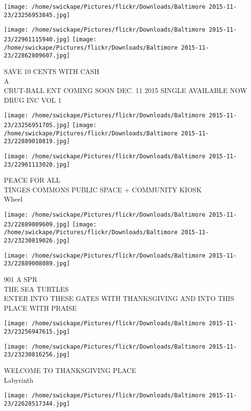 \documentclass[10pt,letterpaper]{article}
\begin{document}
\texttt{[image: /home/swickape/Pictures/flickr/Downloads/Baltimore 2015-11-23/23256953845.jpg]}

\vspace{0.25in}
\texttt{[image: /home/swickape/Pictures/flickr/Downloads/Baltimore 2015-11-23/22961115940.jpg]}
\texttt{[image: /home/swickape/Pictures/flickr/Downloads/Baltimore 2015-11-23/22862809607.jpg]}

SAVE 10 CENTS WITH CASH\\
A\\
CRUT{-}BALL ENT COMING SOON DEC. 11 2015 SINGLE AVAILABLE NOW DRUG INC VOL 1
\pagebreak

\texttt{[image: /home/swickape/Pictures/flickr/Downloads/Baltimore 2015-11-23/23256951705.jpg]}
\texttt{[image: /home/swickape/Pictures/flickr/Downloads/Baltimore 2015-11-23/22889010819.jpg]}

\vspace{0.25in}
\texttt{[image: /home/swickape/Pictures/flickr/Downloads/Baltimore 2015-11-23/22961113020.jpg]}

PEACE FOR ALL\\
TINGES COMMONS PUBLIC SPACE + COMMUNITY KIOSK\\
Wheel
\pagebreak

\texttt{[image: /home/swickape/Pictures/flickr/Downloads/Baltimore 2015-11-23/22889009609.jpg]}
\texttt{[image: /home/swickape/Pictures/flickr/Downloads/Baltimore 2015-11-23/23230819026.jpg]}

\texttt{[image: /home/swickape/Pictures/flickr/Downloads/Baltimore 2015-11-23/22889008089.jpg]}

901 A SPR\\
THE SEA TURTLES\\
ENTER INTO THESE GATES WITH THANKSGIVING AND INTO THIS PLACE WITH PRAISE
\pagebreak

\texttt{[image: /home/swickape/Pictures/flickr/Downloads/Baltimore 2015-11-23/23256947615.jpg]}

\vspace{0.25in}
\texttt{[image: /home/swickape/Pictures/flickr/Downloads/Baltimore 2015-11-23/23230816256.jpg]}

WELCOME TO THANKSGIVING PLACE\\
Labyrinth
\pagebreak

\texttt{[image: /home/swickape/Pictures/flickr/Downloads/Baltimore 2015-11-23/22628517344.jpg]}
\end{document}
